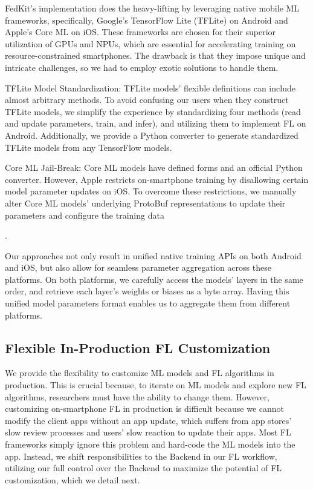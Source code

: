 \documentclass[letterpaper]{article} %
\begin{document}
FedKit's implementation does the heavy-lifting by leveraging
native mobile ML frameworks, specifically,
Google's TensorFlow Lite (TFLite) on Android and Apple's Core ML on iOS.
These frameworks are chosen for their superior utilization of GPUs and NPUs,
which are essential for accelerating training on resource-constrained smartphones.
The drawback is that they impose unique and intricate challenges,
so we had to employ exotic solutions to handle them.
\begin{enumerate*}[label=\arabic*)]
    \item TFLite Model Standardization:
        TFLite models' flexible definitions can include almost arbitrary methods.
        To avoid confusing our users when they construct TFLite models,
        we simplify the experience by standardizing four methods
        (read and update parameters, train, and infer),
        and utilizing them to implement FL on Android.
        Additionally, we provide a Python converter to generate
        standardized TFLite models from any TensorFlow models.
    \item Core ML Jail-Break:
        Core ML models have defined forms and an official Python converter.
        However, Apple restricts on-smartphone training by disallowing
        certain model parameter updates on iOS.
        To overcome these restrictions, we manually alter
        Core ML models' underlying ProtoBuf representations to
        update their parameters and configure the training data
\end{enumerate*}.

Our approaches not only result in unified native training APIs on
both Android and iOS, but also
allow for seamless parameter aggregation across these platforms.
On both platforms,
we carefully access the models' layers in the same order,
and retrieve each layer's weights or biases as a byte array.
Having this unified model parameters format enables us to
aggregate them from different platforms.

\subsection{Flexible In-Production FL Customization}
\newcommand{\model}{$M$}
\newcommand{\fs}{$S_\mathrm F$}
We provide the flexibility to customize ML models and FL algorithms
in production.
This is crucial because, to iterate on ML models and explore new FL algorithms,
researchers must have the ability to change them.
However, customizing on-smartphone FL in production is difficult because
we cannot modify the client apps without an app update,
which suffers from app stores' slow review processes and
users' slow reaction to update their apps.
Most FL frameworks simply ignore this problem and
hard-code the ML models into the app.
Instead, we shift responsibilities to the Backend in our FL workflow,
utilizing our full control over the Backend to
maximize the potential of FL customization,
which we detail next.
\end{document}
